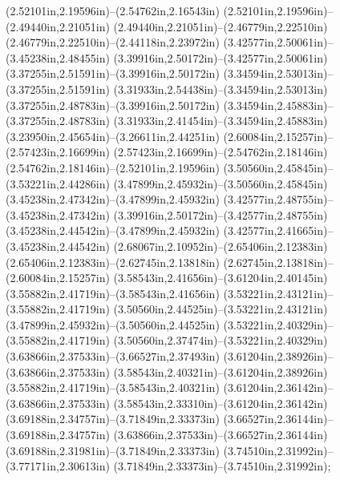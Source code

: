 (2.52101in,2.19596in)--(2.54762in,2.16543in) (2.52101in,2.19596in)--(2.49440in,2.21051in) (2.49440in,2.21051in)--(2.46779in,2.22510in) (2.46779in,2.22510in)--(2.44118in,2.23972in) (3.42577in,2.50061in)--(3.45238in,2.48455in) (3.39916in,2.50172in)--(3.42577in,2.50061in) (3.37255in,2.51591in)--(3.39916in,2.50172in) (3.34594in,2.53013in)--(3.37255in,2.51591in) (3.31933in,2.54438in)--(3.34594in,2.53013in) (3.37255in,2.48783in)--(3.39916in,2.50172in) (3.34594in,2.45883in)--(3.37255in,2.48783in) (3.31933in,2.41454in)--(3.34594in,2.45883in) (3.23950in,2.45654in)--(3.26611in,2.44251in) (2.60084in,2.15257in)--(2.57423in,2.16699in) (2.57423in,2.16699in)--(2.54762in,2.18146in) (2.54762in,2.18146in)--(2.52101in,2.19596in) (3.50560in,2.45845in)--(3.53221in,2.44286in) (3.47899in,2.45932in)--(3.50560in,2.45845in) (3.45238in,2.47342in)--(3.47899in,2.45932in) (3.42577in,2.48755in)--(3.45238in,2.47342in) (3.39916in,2.50172in)--(3.42577in,2.48755in) (3.45238in,2.44542in)--(3.47899in,2.45932in) (3.42577in,2.41665in)--(3.45238in,2.44542in) (2.68067in,2.10952in)--(2.65406in,2.12383in) (2.65406in,2.12383in)--(2.62745in,2.13818in) (2.62745in,2.13818in)--(2.60084in,2.15257in) (3.58543in,2.41656in)--(3.61204in,2.40145in) (3.55882in,2.41719in)--(3.58543in,2.41656in) (3.53221in,2.43121in)--(3.55882in,2.41719in) (3.50560in,2.44525in)--(3.53221in,2.43121in) (3.47899in,2.45932in)--(3.50560in,2.44525in) (3.53221in,2.40329in)--(3.55882in,2.41719in) (3.50560in,2.37474in)--(3.53221in,2.40329in) (3.63866in,2.37533in)--(3.66527in,2.37493in) (3.61204in,2.38926in)--(3.63866in,2.37533in) (3.58543in,2.40321in)--(3.61204in,2.38926in) (3.55882in,2.41719in)--(3.58543in,2.40321in) (3.61204in,2.36142in)--(3.63866in,2.37533in) (3.58543in,2.33310in)--(3.61204in,2.36142in) (3.69188in,2.34757in)--(3.71849in,2.33373in) (3.66527in,2.36144in)--(3.69188in,2.34757in) (3.63866in,2.37533in)--(3.66527in,2.36144in) (3.69188in,2.31981in)--(3.71849in,2.33373in) (3.74510in,2.31992in)--(3.77171in,2.30613in) (3.71849in,2.33373in)--(3.74510in,2.31992in);
